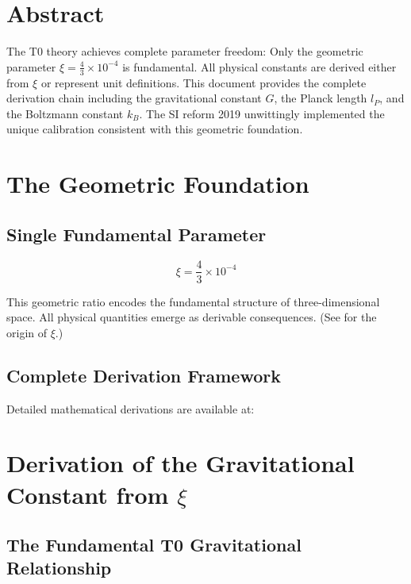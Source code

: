 \section*{Abstract}
		The T0 theory achieves complete parameter freedom: Only the geometric parameter $\xi = \frac{4}{3} \times 10^{-4}$ is fundamental. All physical constants are derived either from $\xi$ or represent unit definitions. This document provides the complete derivation chain including the gravitational constant $G$, the Planck length $l_P$, and the Boltzmann constant $k_B$. The SI reform 2019 unwittingly implemented the unique calibration consistent with this geometric foundation.

	
	
	
	
	\section{The Geometric Foundation}
	
	\subsection{Single Fundamental Parameter}
	
	\begin{equation}
		\boxed{\xi = \frac{4}{3} \times 10^{-4}}
	\end{equation}
	
	This geometric ratio encodes the fundamental structure of three-dimensional space. All physical quantities emerge as derivable consequences. (See \cite{T0_xi_origin_En} for the origin of $\xi$.)
	
	\subsection{Complete Derivation Framework}
	
	Detailed mathematical derivations are available at:
	
	\begin{center}
		
	\end{center}
	
	\section{Derivation of the Gravitational Constant from $\xi$}
	
	\subsection{The Fundamental T0 Gravitational Relationship}
	
